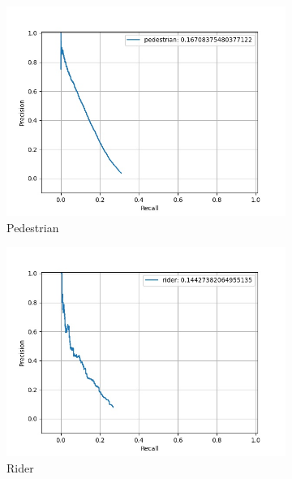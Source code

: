     \begin{figure}
    	\centering
    	\label{fig:pr_basic}
    	\begin{subfigure}[t]{0.325\textwidth}
    		\centering
    		\includegraphics[width=\textwidth]{images/tuned_pr/class_pedestrian_pr.jpg}
    		\caption{Pedestrian}
    	\end{subfigure}
    	\begin{subfigure}[t]{0.325\textwidth}
    		\centering
    		\includegraphics[width=\textwidth]{images/tuned_pr/class_rider_pr.jpg}
    		\caption{Rider}
    	\end{subfigure}
    	\begin{subfigure}[t]{0.325\textwidth}
    		\centering

\end{subfigure}
\end{figure}
